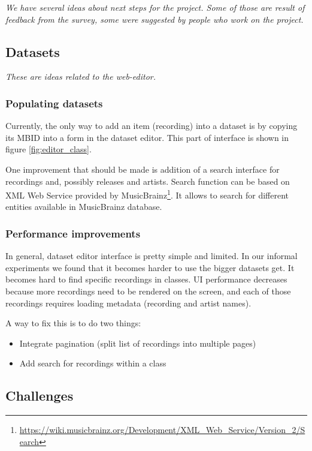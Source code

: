 \textit{We have several ideas about next steps for the project. Some of those are result of feedback from the survey, some were suggested by people who work on the project.}

\subsection{Datasets}

\textit{These are ideas related to the web-editor.}

\subsubsection{Populating datasets}

Currently, the only way to add an item (recording) into a dataset is by copying its MBID into a form in the dataset editor. This part of interface is shown in figure \ref{fig:editor_class}.

One improvement that should be made is addition of a search interface for recordings and, possibly releases and artists. Search function can be based on XML Web Service provided by MusicBrainz\footnote{\url{https://wiki.musicbrainz.org/Development/XML_Web_Service/Version_2/Search}}. It allows to search for different entities available in MusicBrainz database.

\subsubsection{Performance improvements}

In general, dataset editor interface is pretty simple and limited. In our informal experiments we found that it becomes harder to use the bigger datasets get. It becomes hard to find specific recordings in classes. UI performance decreases because more recordings need to be rendered on the screen, and each of those recordings requires loading metadata (recording and artist names).

A way to fix this is to do two things:
\begin{itemize}
    \item Integrate pagination (split list of recordings into multiple pages)
    \item Add search for recordings within a class
\end{itemize}

\subsection{Challenges}

